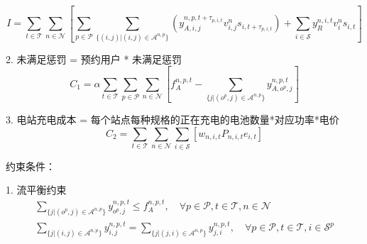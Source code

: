 \documentclass[12pt,hyperref,a4paper,UTF8]{ctexart}
\begin{document}
\begin{equation}
I=\sum_{t \in \mathcal{T}}  \sum_{n \in \mathcal{N}} 
\left[  
\sum_{p \in \mathcal{P}} 
\sum_{\{(i,j) | (i,j) \in \mathcal{A}^{n,p}\}} 
\left ( y^{n,p,t+\tau_{p,i,t}}_{A,i,j}v^{n}_{i,j}s_{i,t+\tau_{p,i,t}} \right )
+\sum_{i \in \mathcal{S}} y_{R}^{n,i,t}v^n_is_{i,t}
\right]
\end{equation}



2. 未满足惩罚 = 预约用户 * 未满足惩罚
\begin{equation}
C_1 = \alpha \sum_{t\in \mathcal{T}} \sum_{p\in \mathcal{P}}  \sum_{n\in \mathcal{N}} 
\left[
f^{n,p,t}_A - \sum_{\{j | (o^p,j) \in \mathcal{A}^{n,p}\}} y^{n,p,t}_{A,o^p,j} \right]
\label{eq:penaltycost}
\end{equation}

3. 电站充电成本 = 每个站点每种规格的正在充电的电池数量*对应功率*电价
\begin{equation}
C_2 = \sum_{t \in \mathcal{T}}  \sum_{n \in \mathcal{N}} \sum_{i \in \mathcal{S}}
\left[
w_{n,i,t}P_{n,i,t}e_{i,t}
\right]
\end{equation}

约束条件：

1. 流平衡约束
\begin{subequations}
\label{eq:flow}
\begin{gather}
\sum_{\{j| (o^p,j)\in \mathcal{A}^{n,p}\}}{y^{n,p,t}_{o^p,j}} \leq f^{n,p,t}_A,\quad \forall{p\in \mathcal{P},t\in \mathcal{T}},n \in \mathcal{N}\label{eq:flow1}\\
\sum_{\{j| (i,j)\in \mathcal{A}^{n,p}\}}{y^{n,p,t}_{i,j}} =\sum_{\{j| (j,i)\in \mathcal{A}^{n,p}\}}{y^{n,p,t}_{j,i}},\quad \forall{p\in \mathcal{P},t\in \mathcal{T},i\in \mathcal{S}^p}\label{eq:flow2}
\end{gather}
\end{subequations}
\end{document}
